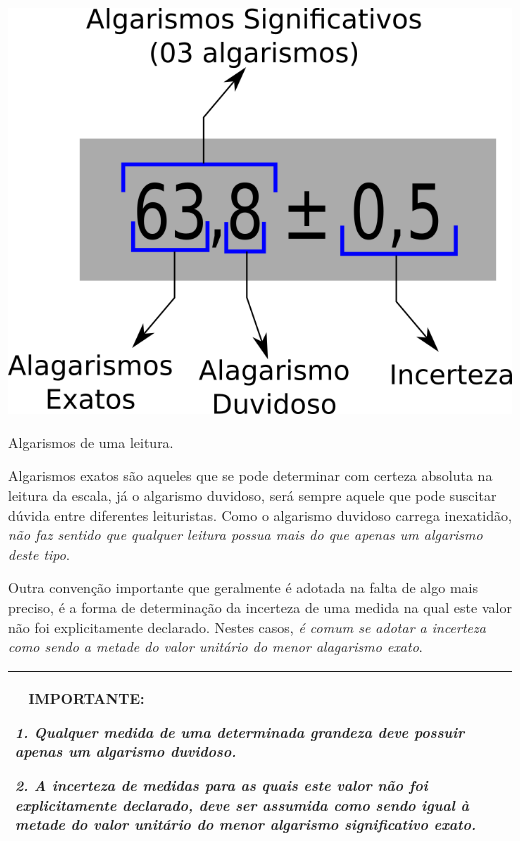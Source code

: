 \documentclass[a4paper, 11pt]{report}
\newenvironment{myboxed}
    {
        \begin{center}
        \begin{tabular}{p{0.7\textwidth}}
        \hline\
    }
    { 
        \\\hline
        \end{tabular} 
        \end{center}
    }
\begin{document}
\begin{staticfigure}
    \centering
    \includegraphics[scale=.55]{img/algarismossig.png}
    \caption{\footnotesize Algarismos de uma leitura.}
    \label{Img:algsign}
\end{staticfigure}

Algarismos exatos são aqueles que se pode determinar com certeza absoluta na 
leitura da escala, já o algarismo duvidoso, será sempre aquele que pode 
suscitar dúvida entre diferentes leituristas. Como o algarismo duvidoso 
carrega inexatidão, \emph{não faz sentido que qualquer leitura possua mais do que 
apenas um algarismo deste tipo}.

Outra convenção importante que geralmente é adotada na falta de algo mais 
preciso, é a forma de determinação da incerteza de uma medida na qual este 
valor não foi explicitamente declarado. Nestes casos, \emph{é comum se adotar a 
incerteza como sendo a metade do valor unitário do menor alagarismo exato}.

\begin{myboxed}
    \textbf{IMPORTANTE:}

    \emph{
    1. Qualquer medida de uma determinada grandeza deve possuir apenas um 
    algarismo duvidoso.
    }

    \emph{
    2. A incerteza de medidas para as quais este valor não foi explicitamente 
    declarado, deve ser assumida como sendo igual à metade do valor unitário do
    menor algarismo significativo exato.
    }
\end{myboxed}
\end{document}
